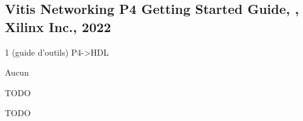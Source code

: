 
\subsection{Vitis Networking P4 Getting
Started Guide, \cite{noauthor_vitis_2022}, Xilinx Inc., 2022}
 1 (guide d'outils)
 P4->HDL

 Aucun

 TODO

 TODO

\clearpage
